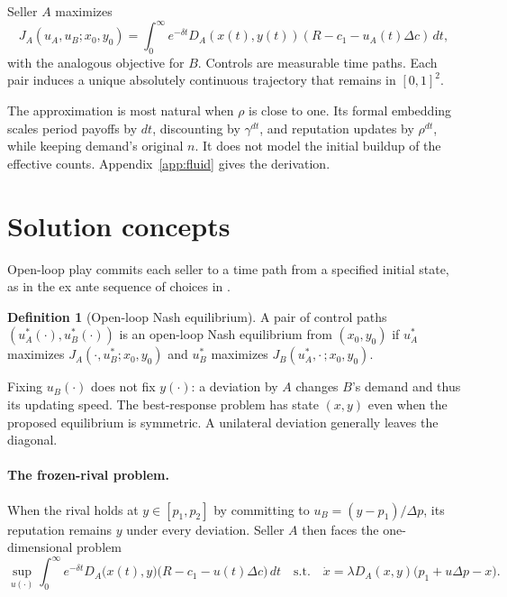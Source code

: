 \documentclass[11pt]{article}
\theoremstyle{definition}
\newtheorem{definition}{Definition}
\begin{document}
Seller $A$ maximizes
\begin{equation}\label{eq:payoff}
J_A(u_A,u_B;x_0,y_0)=\int_0^\infty e^{-\delta t}
D_A(x(t),y(t))(R-c_1-u_A(t)\Delta c)\,dt,
\end{equation}
with the analogous objective for $B$. Controls are measurable time paths.
Each pair induces a unique absolutely continuous trajectory that remains
in $[0,1]^2$.

The approximation is most natural when $\rho$ is close to one. Its formal
embedding scales period payoffs by $dt$, discounting by $\gamma^{dt}$, and
reputation updates by $\rho^{dt}$, while keeping demand's original $n$.
It does not model the initial buildup of the effective counts.
Appendix~\ref{app:fluid} gives the derivation.

\section{Solution concepts}\label{sec:fluid-solution-concepts}

Open-loop play commits each seller to a time path from a specified initial
state, as in the ex ante sequence of choices in \cite{hu2026}.

\begin{definition}[Open-loop Nash equilibrium]
A pair of control paths $(u_A^*(\cdot),u_B^*(\cdot))$ is an open-loop Nash
equilibrium from $(x_0,y_0)$ if $u_A^*$ maximizes
$J_A(\cdot,u_B^*;x_0,y_0)$ and $u_B^*$ maximizes
$J_B(u_A^*,\cdot\,;x_0,y_0)$.
\end{definition}

Fixing $u_B(\cdot)$ does not fix $y(\cdot)$: a deviation by $A$ changes
$B$'s demand and thus its updating speed. The best-response problem has
state $(x,y)$ even when the proposed equilibrium is symmetric. A unilateral
deviation generally leaves the diagonal.

\paragraph{The frozen-rival problem.}
When the rival holds at $y\in[p_1,p_2]$ by committing to
$u_B=(y-p_1)/\Delta p$, its reputation remains $y$ under every deviation.
Seller $A$ then faces the one-dimensional problem
\begin{equation}\label{eq:frozen-rival}
\sup_{u(\cdot)}\int_0^\infty e^{-\delta t}D_A\bigl(x(t),y\bigr)
\bigl(R-c_1-u(t)\Delta c\bigr)\,dt
\quad\text{s.t.}\quad
\dot x=\lambda D_A(x,y)\bigl(p_1+u\Delta p-x\bigr).
\end{equation}
\end{document}
